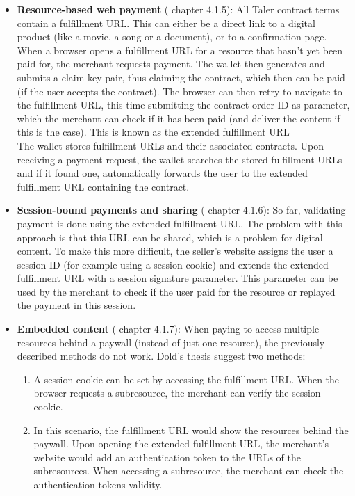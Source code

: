 \begin{itemize}
    \item \textbf{Resource-based web payment} (\cite{dold:the-gnu-taler-system} chapter 4.1.5):
          All Taler contract terms contain a fulfillment URL.
          This can either be a direct link to a digital product (like a movie, a song or a document), or to a confirmation page.
          When a browser opens a fulfillment URL for a resource that hasn't yet been paid for, the merchant requests payment.
          The wallet then generates and submits a claim key pair, thus claiming the contract, which then can be paid (if the user accepts the contract).
          The browser can then retry to navigate to the fulfillment URL, this time submitting the contract order ID as parameter, which the merchant can check if it has been paid (and deliver the content if this is the case).
          This is known as the extended fulfillment URL
          \\The wallet stores fulfillment URLs and their associated contracts.
          Upon receiving a payment request, the wallet searches the stored fulfillment URLs and if it found one, automatically forwards the user to the extended fulfillment URL containing the contract.
    \item \textbf{Session-bound payments and sharing} (\cite{dold:the-gnu-taler-system} chapter 4.1.6):
          So far, validating payment is done using the extended fulfillment URL.
          The problem with this approach is that this URL can be shared, which is a problem for digital content.
          To make this more difficult, the seller's website assigns the user a session ID (for example using a session cookie) and extends the extended fulfillment URL with a session signature parameter.
          This parameter can be used by the merchant to check if the user paid for the resource or replayed the payment in this session.
    \item \textbf{Embedded content} (\cite{dold:the-gnu-taler-system} chapter 4.1.7):
          When paying to access multiple resources behind a paywall (instead of just one resource), the previously described methods do not work.
          Dold's thesis suggest two methods:
          \begin{enumerate}
              \item A session cookie can be set by accessing the fulfillment URL.
                    When the browser requests a subresource, the merchant can verify the session cookie.
              \item In this scenario, the fulfillment URL would show the resources behind the paywall.
                    Upon opening the extended fulfillment URL, the merchant's website would add an authentication token to the URLs of the subresources.
                    When accessing a subresource, the merchant can check the authentication tokens validity.
          \end{enumerate}
\end{itemize}

